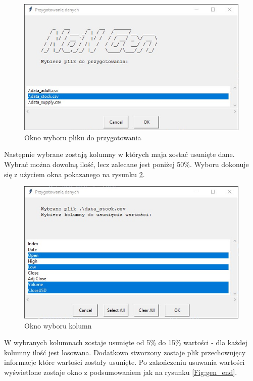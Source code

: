 \documentclass[12pt,twoside]{article}
\begin{document}
\begin{figure}[ht]
	\centering
	\includegraphics[width=12cm]{img/02.jpg}
	\caption{Okno wyboru pliku do przygotowania}
\label{Fig:gen_file}
\end{figure}

Następnie wybrane zostają kolumny w których maja zostać usunięte dane. Wybrać można dowolną ilość, lecz zalecane jest poniżej 50\%.
Wyboru dokonuje się z użyciem okna pokazanego na rysunku \ref{Fig:gen_col}.

\begin{figure}[ht]
	\centering
	\includegraphics[width=12cm]{img/03.jpg}
	\caption{Okno wyboru kolumn}
\label{Fig:gen_col}
\end{figure}

W wybranych kolumnach zostaje usunięte od 5\% do 15\% wartości - dla każdej kolumny ilość jest losowana.
Dodatkowo stworzony zostaje plik przechowujęcy informacje które wartości zostały usunięte.
Po zakończeniu usuwania wartości wyświetlone zostaje okno z podsumowaniem jak na rysunku \ref{Fig:gen_end}.
\end{document}
